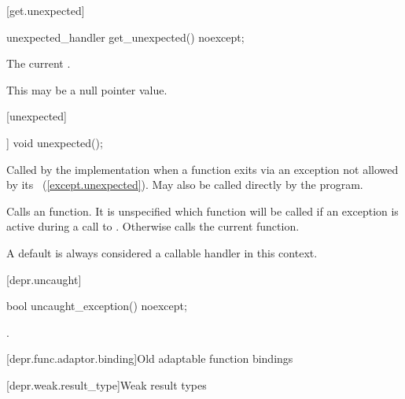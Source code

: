 [get.unexpected]{}

\begin{itemdecl}
unexpected_handler get_unexpected() noexcept;
\end{itemdecl}

\begin{itemdescr}
\pnum
\returns The current .
\begin{note} This may be a null pointer value. \end{note}
\end{itemdescr}

[unexpected]{}

%
\begin{itemdecl}
[[noreturn]] void unexpected();
\end{itemdecl}

\begin{itemdescr}
\pnum
\remarks
Called by the implementation when a function exits via an exception not allowed by its
~(\ref{except.unexpected}).
May also be called directly by the program.

\pnum
\effects
Calls an  function. It is unspecified which
 function will be called if an exception is active
during a call to .
Otherwise calls the current  function.
\begin{note} A default  is always considered a callable handler in
this context. \end{note}
\end{itemdescr}

[depr.uncaught]{}

%
\begin{itemdecl}
bool uncaught_exception() noexcept;
\end{itemdecl}

\begin{itemdescr}
\pnum
\returns {}.
\end{itemdescr}

[depr.func.adaptor.binding]{Old adaptable function bindings}

[depr.weak.result_type]{Weak result types}

